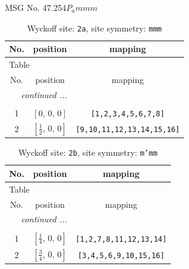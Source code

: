 \documentclass[fleqn,8pt]{jsarticle}
\begin{document}
\setcounter{MaxMatrixCols}{32}

\renewcommand{\tablename}{Table~}
\renewcommand{\figurename}{Figure~}
\begin{center}
\LARGE
MSG No. 47.254\quad$P_{a}mmm$
\end{center}
\renewcommand{\arraystretch}{1.2}
\begin{longtable}{ccc}
\caption{Wyckoff site: {\tt 2a}, site symmetry: {\tt mmm}}
 \\
 \hline \hline
No. & position & mapping \\ \hline \endfirsthead

\multicolumn{2}{l}{\tablename\ \thetable{}} \\
 \hline \hline
No. & position & mapping \\ \hline \endhead

 \hline \hline
\multicolumn{2}{r}{\footnotesize\it continued ...} \\ \endfoot

 \hline \hline
\multicolumn{2}{r}{} \\ \endlastfoot

1 & $\left[ 0,\, 0,\, 0 \right]$ & {\tt [1,2,3,4,5,6,7,8]} \\ \hline
2 & $\left[ \frac{1}{2},\, 0,\, 0 \right]$ & {\tt [9,10,11,12,13,14,15,16]} \\
\end{longtable}
\renewcommand{\arraystretch}{1.2}
\begin{longtable}{ccc}
\caption{Wyckoff site: {\tt 2b}, site symmetry: {\tt m'mm}}
 \\
 \hline \hline
No. & position & mapping \\ \hline \endfirsthead

\multicolumn{2}{l}{\tablename\ \thetable{}} \\
 \hline \hline
No. & position & mapping \\ \hline \endhead

 \hline \hline
\multicolumn{2}{r}{\footnotesize\it continued ...} \\ \endfoot

 \hline \hline
\multicolumn{2}{r}{} \\ \endlastfoot

1 & $\left[ \frac{1}{4},\, 0,\, 0 \right]$ & {\tt [1,2,7,8,11,12,13,14]} \\ \hline
2 & $\left[ \frac{3}{4},\, 0,\, 0 \right]$ & {\tt [3,4,5,6,9,10,15,16]} \\
\end{longtable}
\end{document}
